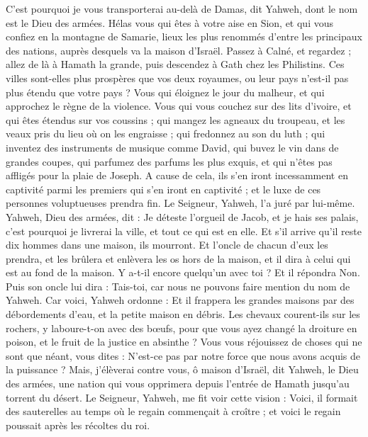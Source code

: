 \begin{multicols}{2}
C'est pourquoi je vous transporterai au-delà de Damas, dit Yahweh, dont le nom est le Dieu des armées.
\VerseOne{}Hélas vous qui êtes à votre aise en Sion, et qui vous confiez en la montagne de Samarie, lieux les plus renommés d'entre les principaux des nations, auprès desquels va la maison d'Israël.
Passez à Calné, et regardez ; allez de là à Hamath la grande, puis descendez à Gath chez les Philistins. Ces villes sont-elles plus prospères que vos deux royaumes, ou leur pays n'est-il pas plus étendu que votre pays ?
Vous qui éloignez le jour du malheur, et qui approchez le règne de la violence.
Vous qui vous couchez sur des lits d'ivoire, et qui êtes étendus sur vos coussins ; qui mangez les agneaux du troupeau, et les veaux pris du lieu où on les engraisse ;
qui fredonnez au son du luth ; qui inventez des instruments de musique comme David,
qui buvez le vin dans de grandes coupes, qui parfumez des parfums les plus exquis, et qui n'êtes pas affligés pour la plaie de Joseph.
A cause de cela, ils s'en iront incessamment en captivité parmi les premiers qui s'en iront en captivité ; et le luxe de ces personnes voluptueuses prendra fin.  
Le Seigneur, Yahweh, l'a juré par lui-même. Yahweh, Dieu des armées, dit : Je déteste l'orgueil de Jacob, et je hais ses palais, c'est pourquoi je livrerai la ville, et tout ce qui est en elle.
Et s'il arrive qu'il reste dix hommes dans une maison, ils mourront.
Et l'oncle de chacun d'eux les prendra, et les brûlera et enlèvera les os hors de la maison, et il dira à celui qui est au fond de la maison. Y a-t-il encore quelqu’un avec toi ? Et il répondra Non. Puis son oncle lui dira : Tais-toi, car nous ne pouvons faire mention du nom de Yahweh.
Car voici, Yahweh ordonne : Et il frappera les grandes maisons par des débordements d'eau, et la petite maison en débris.
Les chevaux courent-ils sur les rochers, y laboure-t-on avec des bœufs, pour que vous ayez changé la droiture en poison, et le fruit de la justice en absinthe ?
Vous vous réjouissez de choses qui ne sont que néant, vous dites : N'est-ce pas par notre force que nous avons acquis de la puissance ?
Mais, j'élèverai contre vous, ô maison d'Israël, dit Yahweh, le Dieu des armées, une nation qui vous opprimera depuis l'entrée de Hamath jusqu'au torrent du désert.
\VerseOne{}Le Seigneur, Yahweh, me fit voir cette vision : Voici, il formait des sauterelles au temps où le regain commençait à croître ; et voici le regain poussait après les récoltes du roi.

\end{multicols}
